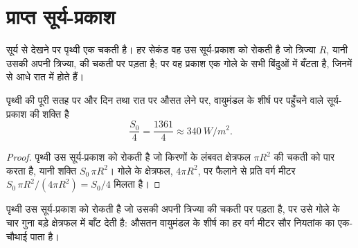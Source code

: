 \section{प्राप्त सूर्य-प्रकाश}

सूर्य से देखने पर पृथ्वी एक चकती है। हर सेकंड वह उस सूर्य-प्रकाश को रोकती है जो
त्रिज्या $R$, यानी उसकी अपनी त्रिज्या, की चकती पर पड़ता है; पर वह प्रकाश एक गोले के सभी
बिंदुओं में बँटता है, जिनमें से आधे रात में होते हैं।

\begin{proposition}[सौर नियतांक का एक-चौथाई]\label{prop:g10:earth-energy-budget:quarter}
पृथ्वी की पूरी सतह पर और दिन तथा रात पर औसत लेने पर, वायुमंडल के शीर्ष पर पहुँचने वाले
सूर्य-प्रकाश की शक्ति है
\[
  \frac{S_0}{4} = \frac{1361}{4} \approx \qty{340}{W/m^2}.
\]
\end{proposition}

\begin{proof}
पृथ्वी उस सूर्य-प्रकाश को रोकती है जो किरणों के लंबवत क्षेत्रफल $\pi R^2$ की
चकती को पार करता है, यानी शक्ति $S_0\,\pi R^2$। गोले के
क्षेत्रफल, $4\pi R^2$, पर फैलाने से प्रति वर्ग मीटर $S_0\,\pi R^2/(4\pi R^2) =
S_0/4$ मिलता है।
\end{proof}

\begin{omfigure}

{\small पृथ्वी उस सूर्य-प्रकाश को रोकती है जो उसकी अपनी त्रिज्या की चकती पर पड़ता है, पर उसे
गोले के चार गुना बड़े क्षेत्रफल में बाँट देती है: औसतन वायुमंडल के शीर्ष का हर वर्ग मीटर
सौर नियतांक का एक-चौथाई पाता है।}
\end{omfigure}

